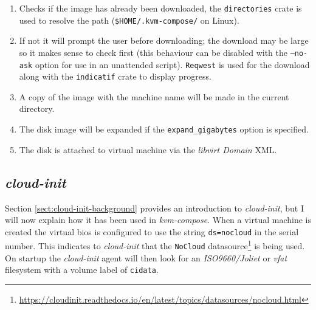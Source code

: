 \documentclass[
    author={Jacob Daniel Halsey},
    supervisor={Prof. Awais Rashid},
    degree={BSc},
    title={Building a Testbed for Evaluating Privacy Enhancing Technologies  (PETs)},
    subtitle={},
    type={software development},
    year={2021}
]{dissertation}
\begin{document}
\begin{singlespace}
	\begin{enumerate}
		\item Checks if the image has already been downloaded, the \texttt{directories} crate 
		is used to resolve the path (\texttt{\$HOME/.kvm-compose/} on Linux).
		\item If not it will prompt the user before downloading; the download may be large so it makes sense
		to check first (this behaviour can be disabled with the \texttt{--no-ask} option for use in
		an unattended script). \texttt{Reqwest} is used for the download along with the \texttt{indicatif}
		crate to display progress.
		\item A copy of the image with the machine name will be made in the current directory.
		\item The disk image will be expanded if the \texttt{expand\_gigabytes} option is specified.
		\item The disk is attached to virtual machine via the \emph{libvirt Domain} XML.
	\end{enumerate}
\end{singlespace}

\subsection{\emph{cloud-init}}

Section \ref{sect:cloud-init-background} provides an introduction to \emph{cloud-init}, but I
will now explain how it has been used in \emph{kvm-compose}.
When a virtual machine is created the virtual bios is configured to use the string
\texttt{ds=nocloud} in the serial number. This indicates to \emph{cloud-init} that 
the \texttt{NoCloud} datasource\footnote{\url{https://cloudinit.readthedocs.io/en/latest/topics/datasources/nocloud.html}}
is being used. On startup the \emph{cloud-init} agent will then look for an \emph{ISO9660/Joliet} or \emph{vfat}
filesystem with a volume label of \texttt{cidata}. \\
\end{document}
